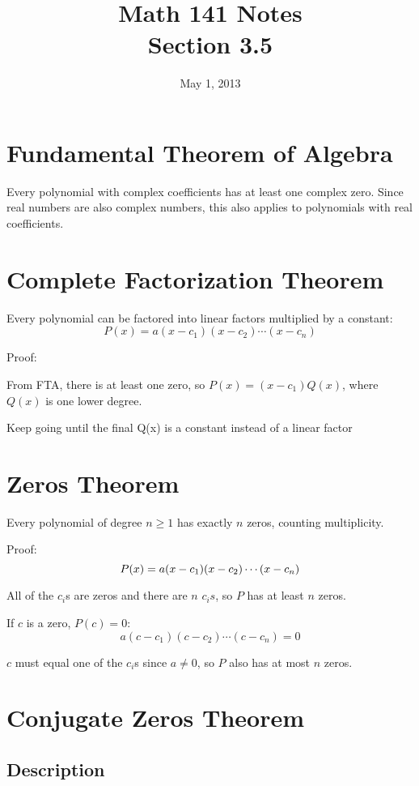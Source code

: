 \documentclass{exam}
\title{Math 141 Notes \\ Section 3.5}
\date{May 1, 2013}
\begin{document}
\maketitle
\tableofcontents

\section{Fundamental Theorem of Algebra}

Every polynomial with complex coefficients has at least one complex zero.  Since real numbers are also complex numbers,
this also applies to polynomials with real coefficients.

\section{Complete Factorization Theorem}
Every polynomial can be factored into linear factors multiplied by a constant:
\[
  P(x) = a(x - c_1)(x - c_2) \cdots (x - c_n)
\]

Proof:
\begin{itemize*}
  \item From FTA, there is at least one zero, so $P(x) = (x - c_1) Q(x)$, where $Q(x)$ is one lower degree.
  \item Keep going until the final Q(x) is a constant instead of a linear factor
\end{itemize*}

\section{Zeros Theorem}
Every polynomial of degree $n \geq 1$ has exactly $n$ zeros, counting multiplicity.

Proof:
\[
  P(x) = a(x - c_1)(x - c_2) \cdots (x - c_n) \\
\]

All of the $c_i$s are zeros and there are $n$ $c_is$, so $P$ has at least $n$ zeros.

If $c$ is a zero, $P(c) = 0$:
\[
  a (c - c_1)(c - c_2) \cdots (c - c_n) = 0
\]
    
$c$ must equal one of the $c_i$s since $a \neq 0$, so $P$ also has at most $n$ zeros.

\section{Conjugate Zeros Theorem}

\subsection{Description}
\end{document}
